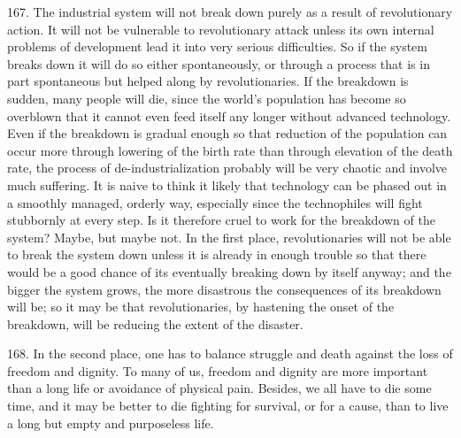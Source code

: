 \documentclass{article}
\begin{document}
\hspace{0.5cm} 167.  The industrial system will not break down purely as a result of revolutionary action.  It will 
not be vulnerable to revolutionary attack unless its own internal problems of development lead it 
into very serious difficulties.  So if the system breaks down it will do so either spontaneously, or 
through a process that is in part spontaneous but helped along by revolutionaries.  If the breakdown 
is  sudden,  many  people  will  die,  since  the  world’s  population  has  become  so  overblown  that  it  
cannot even feed itself any longer without advanced technology.  Even if the breakdown is gradual 
enough so that reduction of the population can occur more through lowering of the birth rate than 
through elevation of the death rate, the process of de-industrialization probably will be very chaotic 
and involve much suffering.  It is naive to think it likely that technology can be phased out in a 
smoothly managed, orderly way, especially since the technophiles will fight stubbornly at every 
step.  Is it therefore cruel to work for the breakdown of the system? Maybe, but maybe not.  In the 
first place, revolutionaries will not be able to break the system down unless it is already in enough 
trouble so that there would be a good chance of its eventually breaking down by itself anyway; 
and the bigger the system grows, the more disastrous the consequences of its breakdown will be; 
so it may be that revolutionaries, by hastening the onset of the breakdown, will be reducing the 
extent of the disaster. \vspace{\baselineskip}

168.  In the second place, one has to balance struggle and death against the loss of freedom and 
dignity.  To many of us, freedom and dignity are more important than a long life or avoidance of 
physical  pain.   Besides,  we  all  have  to  die  some  time,  and  it  may  be  better  to  die  fighting  for  
survival, or for a cause, than to live a long but empty and purposeless life. \vspace{\baselineskip}
\end{document}
